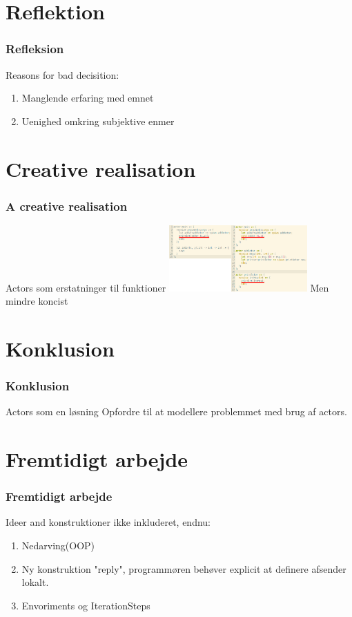 \section{Reflektion}
\begin{frame}
	\frametitle{Refleksion}
	Reasons for bad decisition:
	\begin{enumerate}
    \item Manglende erfaring med emnet
    \item Uenighed omkring subjektive enmer
  \end{enumerate}
\end{frame}

\section{Creative realisation}
\begin{frame}
	\frametitle{A creative realisation}
	Actors som erstatninger til funktioner
	\includegraphics[width=200px]{Images/actorFunc.png}
	Men mindre koncist
\end{frame}

\section{Konklusion}
\begin{frame}
	\frametitle{Konklusion}
	Actors som en løsning
	Opfordre til at modellere problemmet med brug af actors.
\end{frame}

\section{Fremtidigt arbejde}
\begin{frame}
	\frametitle{Fremtidigt arbejde}
	Ideer and konstruktioner ikke inkluderet, endnu: 
  \begin{enumerate}
    \item Nedarving(OOP)
    \item Ny konstruktion "reply", programmøren behøver explicit at definere afsender lokalt.
    \item Envoriments og IterationSteps
  \end{enumerate}
\end{frame}

